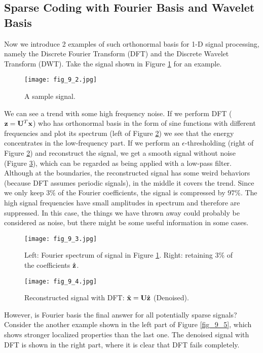 \documentclass[../main.tex]{subfiles}
\begin{document}
\subsection{Sparse Coding with Fourier Basis and Wavelet Basis}
Now we introduce 2 examples of such orthonormal basis for 1-D signal processing, namely the Discrete Fourier Transform (DFT) and the Discrete Wavelet Transform (DWT). Take the signal shown in Figure \ref{fig_9_2} for an example.
\begin{figure}[h] 
	\centering 
	\texttt{[image: fig\_9\_2.jpg]} 
	\caption{A sample signal.}\label{fig_9_2}
\end{figure}
\par We can see a trend with some high frequency noise. If we perform DFT (${\bf z}={\bf U}^T{\bf x}$) who has orthonormal basis in the form of sine functions with different frequencies and plot its spectrum (left of Figure \ref{fig_9_3}) we see that the energy concentrates in the low-frequency part. If we perform an $\epsilon$-thresholding (right of Figure \ref{fig_9_3}) and reconstruct the signal, we get a smooth signal without noise (Figure \ref{fig_9_4}), which can be regarded as being applied with a low-pass filter. Although at the boundaries, the reconstructed signal has some weird behaviors (because DFT assumes periodic signals), in the middle it covers the trend. Since we only keep $3\%$ of the Fourier coefficients, the signal is compressed by $97\%$. The high signal frequencies have small amplitudes in spectrum and therefore are suppressed. In this case, the things we have thrown away could probably be considered as noise, but there might be some useful information in some cases.
\begin{figure}[h] 
	\centering 
	\texttt{[image: fig\_9\_3.jpg]} 
	\caption{Left: Fourier spectrum of signal in Figure \ref{fig_9_2}. Right: retaining $3\%$ of the coefficients $\hat{\bf z}$.}\label{fig_9_3}
\end{figure}
\begin{figure}[h] 
	\centering 
	\texttt{[image: fig\_9\_4.jpg]} 
	\caption{Reconstructed signal with DFT: $\hat{\bf x}={\bf U}\hat{\bf z}$ (Denoised).}\label{fig_9_4}
\end{figure}
\par However, is Fourier basis the final answer for all potentially sparse signals? Consider the another example shown in the left part of Figure \ref{fig_9_5}, which shows stronger localized properties than the last one. The denoised signal with DFT is shown in the right part, where it is clear that DFT fails completely.
\end{document}
